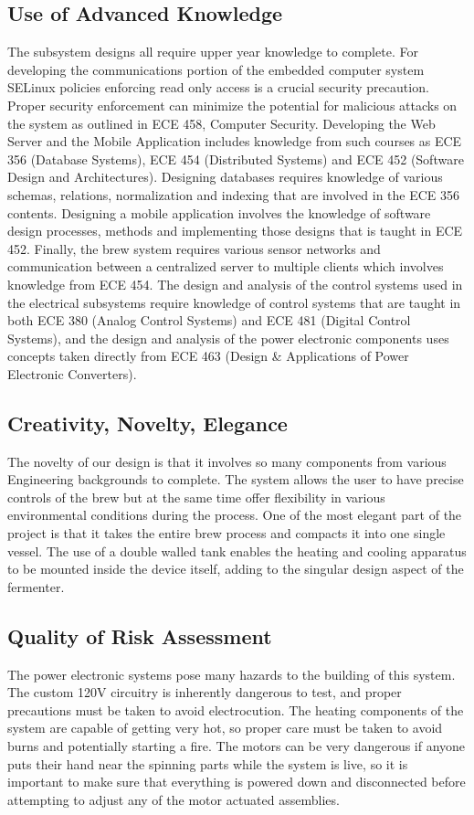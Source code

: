 \documentclass{article}
\begin{document}
\subsection{Use of Advanced Knowledge}
The subsystem designs all require upper year knowledge to complete. For developing the communications portion of the embedded computer system SELinux policies enforcing read only access is a crucial security precaution.  Proper security enforcement can minimize the potential for malicious attacks on the system as outlined in ECE 458, Computer Security.  Developing the Web Server and the Mobile Application includes knowledge from such courses as ECE 356 (Database Systems), ECE 454 (Distributed Systems) and ECE 452 (Software Design and Architectures). Designing databases requires knowledge of various schemas, relations, normalization and indexing that are involved in the ECE 356 contents. Designing a mobile application involves the knowledge of software design processes, methods and implementing those designs that is taught in ECE 452. Finally, the brew system requires various sensor networks and communication between a centralized server to multiple clients which involves knowledge from ECE 454. The design and analysis of the control systems used in the electrical subsystems require knowledge of control systems that are taught in both ECE 380 (Analog Control Systems) and ECE 481 (Digital Control Systems), and the design and analysis of the power electronic components uses concepts taken directly from ECE 463 (Design \& Applications of Power Electronic Converters).
\subsection{Creativity, Novelty, Elegance}
The novelty of our design is that it involves so many components from various Engineering backgrounds to complete. The system allows the user to have precise controls of the brew but at the same time offer flexibility in various environmental conditions during the process. One of the most elegant part of the project is that it takes the entire brew process and compacts it into one single vessel. The use of a double walled tank enables the heating and cooling apparatus to be mounted inside the device itself, adding to the singular design aspect of the fermenter.

\subsection{Quality of Risk Assessment}
The power electronic systems pose many hazards to the building of this system. The custom 120V circuitry is inherently dangerous to test, and proper precautions must be taken to avoid electrocution. The heating components of the system are capable of getting very hot, so proper care must be taken to avoid burns and potentially starting a fire. The motors can be very dangerous if anyone puts their hand near the spinning parts while the system is live, so it is important to make sure that everything is powered down and disconnected before attempting to adjust any of the motor actuated assemblies.
\end{document}
